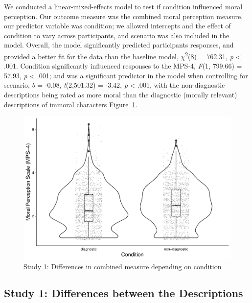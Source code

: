 \documentclass[
  american,
  man,mask,floatsintext]{apa6}
\begin{document}
We conducted a linear-mixed-effects model to test if condition influenced moral perception. Our outcome measure was the combined moral perception measure, our predictor variable was condition; we allowed intercepts and the effect of condition to vary across participants, and scenario was also included in the model.
Overall, the model significantly predicted participants responses, and provided a better fit for the data than the baseline model, \(\chi\)\textsuperscript{2}(8) = 762.31, \emph{p} \textless{} .001. Condition significantly influenced responses to the MPS-4, \emph{F}(1, 799.66) = 57.93, \emph{p} \textless{} .001; and was a significant predictor in the model when controlling for scenario, \(b\) = -0.08, \emph{t}(2,501.32) = -3.42, \emph{p} \textless{} .001, with the non-diagnostic descriptions being rated as more moral than the diagnostic (morally relevant) descriptions of immoral characters Figure~\ref{fig:S1combinedconditionplot}.

\begin{figure}[!h]
\includegraphics[width=\textwidth,]{Supplementary_files/figure-latex/S1combinedconditionplot-1} \caption{Study 1: Differences in combined measure depending on condition}\label{fig:S1combinedconditionplot}
\end{figure}

\hypertarget{study-1-differences-between-the-descriptions}{%
\subsection{Study 1: Differences between the Descriptions}\label{study-1-differences-between-the-descriptions}}
\end{document}
